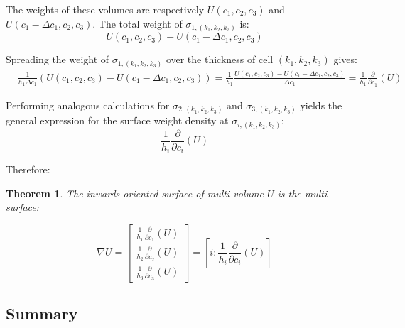 \documentclass{book}
\newtheorem{thm}{Theorem}
\begin{document}
The weights of these volumes are respectively \(U(c_1, c_2, c_3)\) and \(U(c_1 - \Delta c_1, c_2, c_3)\). The total weight of \(\sigma_{1,(k_1,k_2,k_3)}\) is:
\[U(c_1,c_2,c_3) - U(c_1 - \Delta c_1, c_2, c_3)\]

Spreading the weight of \(\sigma_{1, (k_1,k_2,k_3)}\) over the thickness of cell \((k_1, k_2, k_3)\) gives:
\begin{align*}
& \frac{1}{h_1 \Delta c_1}(U(c_1,c_2,c_3) - U(c_1 - \Delta c_1, c_2, c_3)) 
= \frac{1}{h_1}\frac{U(c_1,c_2,c_3) - U(c_1 - \Delta c_1, c_2, c_3)}{\Delta c_1} 
= \frac{1}{h_1}\frac{\partial}{\partial c_1}(U)
\end{align*}

Performing analogous calculations for \(\sigma_{2, (k_1, k_2, k_3)}\) and \(\sigma_{3, (k_1, k_2, k_3)}\) yields the general expression for the surface weight density at \(\sigma_{i, (k_1, k_2, k_3)}\):
\[\frac{1}{h_i}\frac{\partial}{\partial c_i}(U)\]

Therefore:
\begin{thm}
The inwards oriented surface of multi-volume \(U\) is the multi-surface:

\[\nabla U = \begin{bmatrix} \frac{1}{h_1}\frac{\partial}{\partial c_1}(U) \\ \frac{1}{h_2}\frac{\partial}{\partial c_2}(U) \\ \frac{1}{h_3}\frac{\partial}{\partial c_3}(U) \end{bmatrix} = \left[ i :  \frac{1}{h_i}\frac{\partial}{\partial c_i}(U)\right]\]
\end{thm}



\subsection*{Summary}
\end{document}
